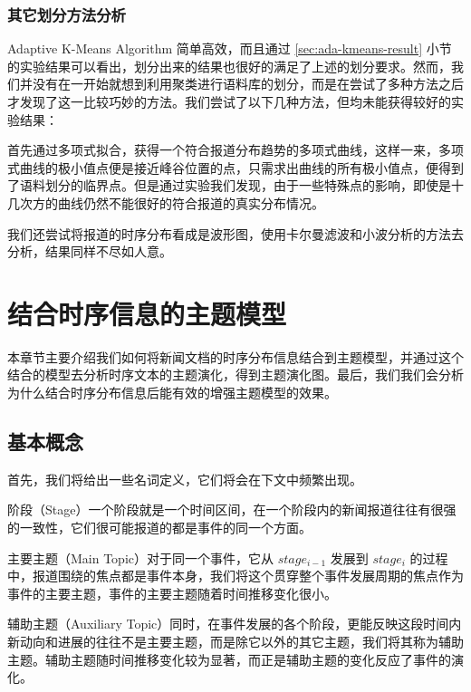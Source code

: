 \subsubsection{其它划分方法分析}
Adaptive K-Means Algorithm 简单高效，而且通过 \ref{sec:ada-kmeans-result} 小节的实验结果可以看出，划分出来的结果也很好的满足了上述的划分要求。然而，我们并没有在一开始就想到利用聚类进行语料库的划分，而是在尝试了多种方法之后才发现了这一比较巧妙的方法。我们尝试了以下几种方法，但均未能获得较好的实验结果：
\begin{inparaenum}
\item 首先通过多项式拟合，获得一个符合报道分布趋势的多项式曲线，这样一来，多项式曲线的极小值点便是接近峰谷位置的点，只需求出曲线的所有极小值点，便得到了语料划分的临界点。但是通过实验我们发现，由于一些特殊点的影响，即使是十几次方的曲线仍然不能很好的符合报道的真实分布情况。
\item 我们还尝试将报道的时序分布看成是波形图，使用卡尔曼滤波和小波分析的方法去分析，结果同样不尽如人意。
\end{inparaenum}

\section{结合时序信息的主题模型}
本章节主要介绍我们如何将新闻文档的时序分布信息结合到主题模型，并通过这个结合的模型去分析时序文本的主题演化，得到主题演化图。最后，我们我们会分析为什么结合时序分布信息后能有效的增强主题模型的效果。
\subsection{基本概念}
\label{sec:concepts}
首先，我们将给出一些名词定义，它们将会在下文中频繁出现。

阶段（Stage）一个阶段就是一个时间区间，在一个阶段内的新闻报道往往有很强的一致性，它们很可能报道的都是事件的同一个方面。

主要主题（Main Topic）对于同一个事件，它从 $stage_{i-1}$ 发展到 $stage_i$  的过程中，报道围绕的焦点都是事件本身，我们将这个贯穿整个事件发展周期的焦点作为事件的主要主题，事件的主要主题随着时间推移变化很小。

辅助主题（Auxiliary Topic）同时，在事件发展的各个阶段，更能反映这段时间内新动向和进展的往往不是主要主题，而是除它以外的其它主题，我们将其称为辅助主题。辅助主题随时间推移变化较为显著，而正是辅助主题的变化反应了事件的演化。

